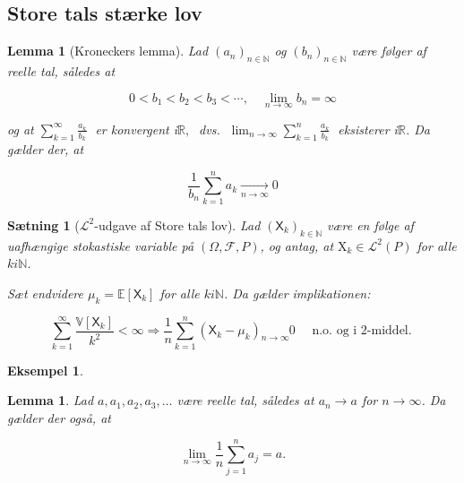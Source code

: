 \documentclass{article}
\newcommand{\1}{\mathbbm{1}}
\newtheorem{lemma}[theorem]{Lemma}
\newtheorem{proposition}[theorem]{Sætning}
\newtheorem{example}[theorem]{Eksempel}
\theoremstyle{boxed}
\begin{document}
\subsection{Store tals stærke lov}
\begin{theorem-box}
    \begin{lemma}[Kroneckers lemma]
        Lad $\left(a_n\right)_{n \in \mathbb{N}}$ og $\left(b_n\right)_{n \in \mathbb{N}}$ være følger af reelle tal, således at

$$
0<b_1<b_2<b_3<\cdots, \quad \lim _{n \rightarrow \infty} b_n=\infty
$$

og at
$\sum_{k=1}^{\infty} \frac{a_k}{b_k} \;$ er konvergent i$ \mathbb{R}, \;$ dvs. $\; \lim _{n \rightarrow \infty} \sum_{k=1}^n \frac{a_k}{b_k} \;$ eksisterer i$ \mathbb{R}$.
Da gælder der, at

$$
\frac{1}{b_n} \sum_{k=1}^n a_k \xrightarrow[n \rightarrow \infty]{ } 0
$$

    \end{lemma}
\end{theorem-box}
\begin{theorem-box}
    \begin{proposition}[$\mathcal{L}^2$-udgave af Store tals lov]
        Lad $\left(\mathsf{X}_k\right)_{k \in \mathbb{N}}$ være en følge af uafhængige stokastiske variable på $(\Omega, \mathcal{F}, P)$, og antag, at $\mathrm{X}_k \in \mathcal{L}^2(P)$ for alle $k i \mathbb{N}$.

        Sæt endvidere $\mu_k=\mathbb{E}\left[\mathsf{X}_k\right]$ for alle $k i \mathbb{N}$.
        Da gælder implikationen:
        
        $$
        \sum_{k=1}^{\infty} \frac{\mathbb{V}\left[\mathsf{X}_k\right]}{k^2}<\infty \Longrightarrow \frac{1}{n} \sum_{k=1}^n\left(\mathsf{X}_k-\mu_k\right) \underset{n \rightarrow \infty}{ } 0 \quad \text { n.o. og i 2-middel. }
        $$
                
    \end{proposition}
\end{theorem-box}
\begin{example}
    
\end{example}
\begin{theorem-box}
    \begin{lemma}
        Lad $a, a_1, a_2, a_3, \ldots$ være reelle tal, således at $a_n \rightarrow a$ for $n \rightarrow \infty$.
Da gælder der også, at

$$
\lim _{n \rightarrow \infty} \frac{1}{n} \sum_{j=1}^n a_j=a .
$$

    \end{lemma}
\end{theorem-box}
\end{document}
